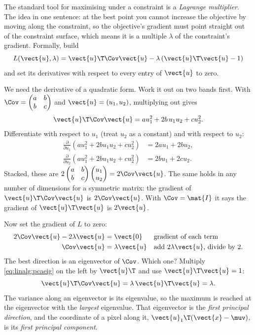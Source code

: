The standard tool for maximising under a constraint is a \emph{Lagrange
multiplier}. The idea in one sentence: at the best point you cannot
increase the objective by moving along the constraint, so the objective's gradient must point
straight out of the constraint surface, which means it is a multiple $\lambda$ of the constraint's
gradient. Formally, build
\[
L(\vect{u}, \lambda) = \vect{u}\T\Cov\vect{u} - \lambda\,(\vect{u}\T\vect{u} - 1)
\]
and set its derivatives with respect to every entry of $\vect{u}$ to zero.

We need the derivative of a quadratic form. Work it out on two bands first. With
$\Cov = \begin{pmatrix} a & b\\ b & c\end{pmatrix}$ and $\vect{u} = (u_1, u_2)$, multiplying out
gives
\[
\vect{u}\T\Cov\vect{u} = a u_1^2 + 2b\,u_1u_2 + c u_2^2 .
\]
Differentiate with respect to $u_1$ (treat $u_2$ as a constant) and with respect to $u_2$:
\begin{align*}
\frac{\partial}{\partial u_1}\left(a u_1^2 + 2bu_1u_2 + cu_2^2\right) &= 2au_1 + 2bu_2,\\
\frac{\partial}{\partial u_2}\left(a u_1^2 + 2bu_1u_2 + cu_2^2\right) &= 2bu_1 + 2cu_2 .
\end{align*}
Stacked, these are $2\begin{pmatrix} a & b\\ b & c\end{pmatrix}\begin{pmatrix}u_1\\u_2\end{pmatrix}
= 2\Cov\vect{u}$. The same holds in any number of dimensions for a symmetric matrix: the gradient
of $\vect{u}\T\Cov\vect{u}$ is $2\Cov\vect{u}$. With $\Cov = \mat{I}$ it says the gradient of
$\vect{u}\T\vect{u}$ is $2\vect{u}$.

Now set the gradient of $L$ to zero:
\begin{align}
2\Cov\vect{u} - 2\lambda\vect{u} &= \vect{0}
  && \text{gradient of each term} \notag\\
\Cov\vect{u} &= \lambda\vect{u}
  && \text{add $2\lambda\vect{u}$, divide by 2.} \label{eq:linalg:pcaeig}
\end{align}
The best direction is an eigenvector of $\Cov$. Which one? Multiply \cref{eq:linalg:pcaeig} on the
left by $\vect{u}\T$ and use $\vect{u}\T\vect{u} = 1$:
\[
\vect{u}\T\Cov\vect{u} = \lambda\,\vect{u}\T\vect{u} = \lambda .
\]
The variance along an eigenvector is its eigenvalue, so the maximum is reached at the eigenvector
with the \emph{largest} eigenvalue. That eigenvector is the \emph{first principal
direction}, and the coordinate of a pixel along it,
$\vect{u}_1\T(\vect{x} - \muv)$, is its \emph{first principal component}.

